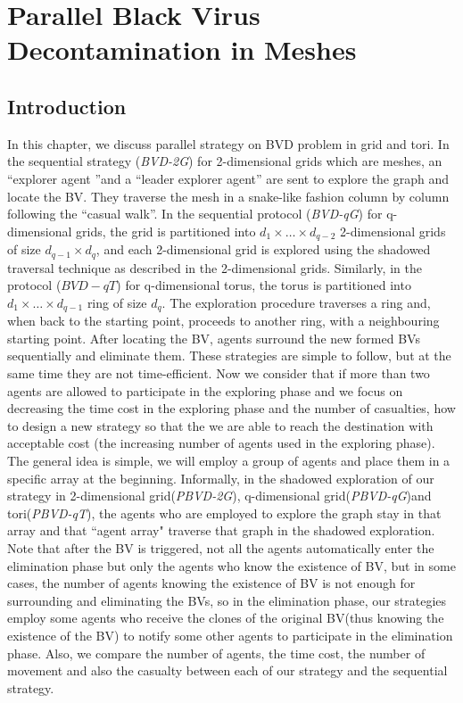 \chapter {Parallel Black Virus Decontamination in Meshes}
\label{DL}
 
\section{Introduction}
In this chapter, we discuss parallel strategy on BVD problem in grid and tori. In the sequential strategy ({\em BVD-2G}) for 2-dimensional grids which are meshes, an ``explorer agent ''and a ``leader explorer agent'' are sent to explore the graph and locate the BV. They traverse the mesh in a snake-like fashion column by column following the ``casual walk''. In the sequential protocol ({\em BVD-qG}) for q-dimensional grids, the grid is partitioned into $d_1\times\ldots\times d_{q-2}$ 2-dimensional grids of size $d_{q-1}\times d_q$, and each 2-dimensional grid is explored using the shadowed traversal technique as described in the 2-dimensional grids. Similarly, in the protocol ($BVD-qT$) for q-dimensional torus, the torus is partitioned into $d_1\times \ldots \times d_{q-1}$ ring of size $d_q$. The exploration procedure traverses a ring and, when back to the starting point, proceeds to another ring, with a neighbouring starting point. After locating the BV, agents surround the new formed BVs sequentially and eliminate them. These strategies are simple to follow, but at the same time they are not time-efficient. Now we consider that if more than two agents are allowed to participate in the exploring phase and we focus on decreasing the time cost in the exploring phase and the number of casualties, how to design a new strategy so that the we are able to reach the destination with acceptable cost (the increasing number of agents used in the exploring phase).\\
The general idea is simple, we will employ a group of agents and place them in a specific array at the beginning. Informally, in the shadowed exploration of our strategy in 2-dimensional grid({\em PBVD-2G}), q-dimensional grid({\em PBVD-qG})and tori({\em PBVD-qT}), the agents who are employed to explore the graph stay in that array and that ``agent array"  traverse that graph in the shadowed exploration. Note that after the BV is triggered, not all the agents automatically enter the elimination phase but only the agents who know the existence of BV, but in some cases, the number of agents knowing the existence of BV is not enough for surrounding and eliminating the BVs, so in the elimination phase, our strategies employ some agents who receive the clones of the original BV(thus knowing the existence of the BV) to notify some other agents to participate in the elimination phase. 
Also, we compare the number of agents, the time cost, the number of movement and also the casualty between each of our strategy and the sequential strategy.

